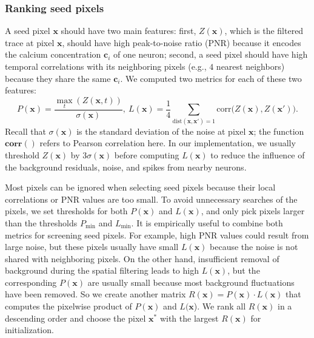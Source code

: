 \documentclass[9pt,lineno]{elife}
\begin{document}
\subsubsection{Ranking seed pixels}
A seed pixel $\bm{x}$ should have two main features: first, $Z(\bm{x})$, which is the filtered trace at pixel $\bm{x}$,  should have high peak-to-noise ratio (PNR) because it encodes the calcium concentration $\bm{c}_i$ of one neuron; second, a seed pixel should have high temporal correlations with  its neighboring pixels (e.g., $4$ nearest neighbors) because they share the same $\bm{c}_i$. We computed two metrics for each of these two features: 
\begin{equation}
  P(\bm{x}) = \frac{\max_t(Z(\bm{x},t))}{\sigma(\bm{x})},~  L(\bm{x})=\frac{1}{4}\sum_{\text{dist}(\bm{x},\bm{x}')=1} \text{corr}\Big(Z(\bm{x}),Z(\bm{x}')\Big). \label{eq:pnr_corr}
\end{equation}
Recall that $\sigma(\bm{x})$ is the standard deviation of the noise at pixel $\bm{x}$; the function $\textbf{corr}()$ refers to Pearson correlation here. In our implementation, we usually threshold  $Z(\bm{x})$ by $3\sigma(\bm{x})$ before computing $L(\bm{x})$ to reduce the influence of the background residuals, noise, and spikes from nearby neurons. 

Most pixels can be ignored when selecting seed pixels because their local correlations or PNR values are too small. To  avoid unnecessary searches of the pixels, we set thresholds for both $P(\bm{x})$  and $L(\bm{x})$, and only pick pixels larger than the thresholds $P_{\min}$ and $L_{\min}$. It is empirically useful to combine both metrics for screening seed pixels. For example, high PNR values could result from  large noise, but these pixels usually have small $L(\bm{x})$ because the noise is not shared with neighboring pixels. On the other hand, insufficient removal of background during the spatial filtering leads to high $L(\bm{x})$, but the corresponding $P(\bm{x})$ are usually small because most background fluctuations have been removed. So we create another matrix $R(\bm{x}) = P(\bm{x})\cdot L(\bm{x})$ that computes the pixelwise product of $P(\bm{x})$ and $L(\bm{x}$). We rank all $R(\bm{x})$ in a descending order and choose the pixel $\bm{x}^*$ with the largest $R(\bm{x})$ for initialization.
\end{document}
